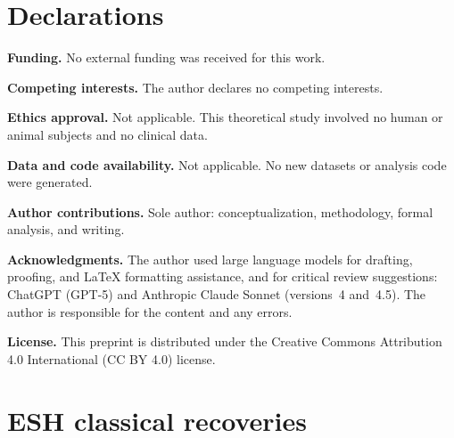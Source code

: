 \documentclass[11pt]{article}
\theoremstyle{upright}
\newcommand{\horizon}{\Lambda}
\begin{document}


\section*{Declarations}

\noindent\textbf{Funding.}
No external funding was received for this work.

\medskip
\noindent\textbf{Competing interests.}
The author declares no competing interests.

\medskip
\noindent\textbf{Ethics approval.}
Not applicable. This theoretical study involved no human or animal subjects and no clinical data.

\medskip
\noindent\textbf{Data and code availability.}
Not applicable. No new datasets or analysis code were generated.

\medskip
\noindent\textbf{Author contributions.}
Sole author: conceptualization, methodology, formal analysis, and writing.

\medskip
\noindent\textbf{Acknowledgments.}
The author used large language models for drafting, proofing, and \LaTeX{} formatting assistance, and for critical review suggestions: ChatGPT (GPT-5) and Anthropic Claude Sonnet (versions~4 and~4.5). 
The author is responsible for the content and any errors.

\medskip
\noindent\textbf{License.}
This preprint is distributed under the Creative Commons Attribution 4.0 International (CC BY 4.0) license.

\appendix
{} %

\section{ESH classical recoveries}
\label{sec:unification}
\end{document}
